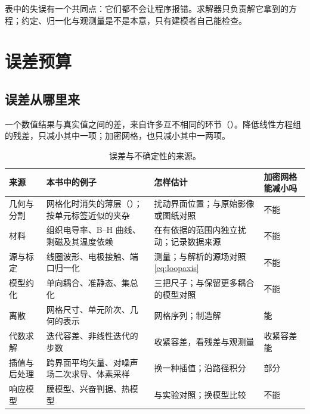表中的失误有一个共同点：它们都不会让程序报错。求解器只负责解它拿到的方程；约定、归一化与观测量是不是本意，只有建模者自己能检查。

\section{误差预算}\label{sec:practice-errorbudget}

\subsection{误差从哪里来}
一个数值结果与真实值之间的差，来自许多互不相同的环节（）。降低线性方程组的残差，只减小其中一项；加密网格，也只减小其中一两项。

\begin{table}[htbp]\centering\small
\caption{误差与不确定性的来源。}\label{tab:practice-sources}
\begin{tabularx}{\linewidth}{@{}>{\raggedright\arraybackslash}p{.13\linewidth} Y Y >{\raggedright\arraybackslash}p{.13\linewidth}@{}}
\toprule
来源 & 本书中的例子 & 怎样估计 & 加密网格能减小吗\\\midrule
几何与分割 & 网格化时消失的薄层（）；按单元标签近似的夹杂 & 扰动界面位置；与原始影像或图纸对照 & 不能\\
材料 & 组织电导率、B--H 曲线、剩磁及其温度依赖 & 在有依据的范围内独立扰动；记录数据来源 & 不能\\
源与标定 & 线圈波形、电极接触、端口归一化 & 测量；与解析的源场对照 \eqref{eq:loopaxis} & 不能\\
模型约化 & 单向耦合、准静态、集总化 & 三把尺子；与保留更多耦合的模型对照 & 不能\\
离散 & 网格尺寸、单元阶次、几何的表示 & 网格序列；制造解 & 能\\
代数求解 & 迭代容差、非线性迭代的步数 & 收紧容差，看残差与观测量 & 收紧容差能\\
插值与后处理 & 跨界面平均矢量、对噪声场二次求导、体素采样 & 换一种插值；沿路径积分 & 部分\\
响应模型 & 膜模型、兴奋判据、热模型 & 与实验对照；换模型比较 & 不能\\
\bottomrule
\end{tabularx}
\end{table}

